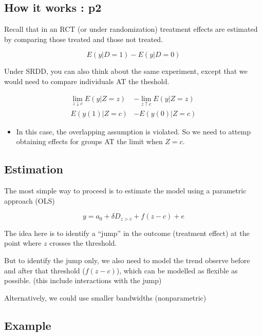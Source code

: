 \documentclass[
  letterpaper,
  DIV=11,
  numbers=noendperiod]{scrartcl}
\providecommand{\tightlist}{%
  \setlength{\itemsep}{0pt}\setlength{\parskip}{0pt}}\usepackage{longtable,booktabs,array}
\begin{document}
\subsection{How it works : p2}\label{how-it-works-p2}

Recall that in an RCT (or under randomization) treatment effects are
estimated by comparing those treated and those not treated.

\[E(y|D=1)-E(y|D=0)\]

Under SRDD, you can also think about the same experiment, except that we
would need to compare individuals AT the theshold.

\[\begin{aligned}
\lim_{z\downarrow c} E(y|Z=z) &- \lim_{z\uparrow c} E(y|Z=z) \\
E(y(1)|Z=c) &-E(y(0)|Z=c)
\end{aligned}
\]

\begin{itemize}
\tightlist
\item
  In this case, the overlapping assumption is violated. So we need to
  attemp obtaining effects for groups AT the limit when \(Z=c\).
\end{itemize}

\subsection{Estimation}\label{estimation}

The most simple way to proceed is to estimate the model using a
parametric approach (OLS)

\[y = a_0 + \delta D_{z>c} + f(z-c) + e\]

The idea here is to identify a ``jump'' in the outcome (treatment
effect) at the point where \(z\) crosses the threshold.

But to identify the jump only, we also need to model the trend observe
before and after that threshold (\(f(z-c)\)), which can be modelled as
flexible as possible. (this include interactions with the jump)

Alternatively, we could use smaller bandwidths (nonparametric)

\subsection{Example}\label{example}
\end{document}

